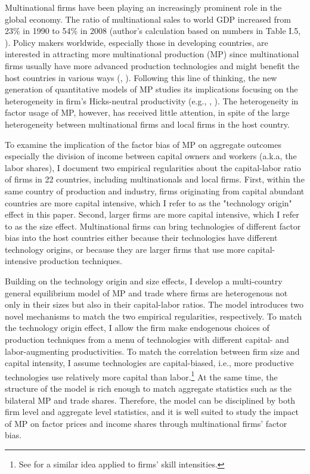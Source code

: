 \documentclass[notitlepage,11pt]{article}%
\begin{document}
Multinational firms have been playing an increasingly prominent role in the
global economy. The ratio of multinational sales to world GDP increased from
23\% in 1990 to 54\% in 2008 (author's calculation based on numbers in Table
I.5, \cite{unctad_world_2011}). Policy makers worldwide, especially those in
developing countries, are interested in attracting more multinational
production (MP) since multinational firms usually have more advanced
production technologies and might benefit the host countries in various ways
(\cite{javorcik_does_2004}, \cite{harrison_trade_2010}). Following this line
of thinking, the new generation of quantitative models of MP studies its
implications focusing on the heterogeneity in firm's Hicks-neutral
productivity (e.g., \cite{arkolakis_innovation_2013},
\cite{tintelnot_global_2014}). The heterogeneity in factor usage of MP,
however, has received little attention, in spite of the large heterogeneity
between multinational firms and local firms in the host country.

To examine the implication of the factor bias of MP on aggregate outcomes
especially the division of income between capital owners and workers (a.k.a,
the labor shares), I document two empirical regularities about the
capital-labor ratio of firms in 22 countries, including multinationals and
local firms. First, within the same country of production and industry, firms
originating from capital abundant countries are more capital intensive, which
I refer to as the "technology origin" effect in this paper. Second, larger
firms are more capital intensive, which I refer to as the size effect.
Multinational firms can bring technologies of different factor bias into the
host countries either because their technologies have different technology
origins, or because they are larger firms that use more capital-intensive
production techniques.

Building on the technology origin and size effects, I develop a multi-country
general equilibrium model of MP and trade where firms are heterogenous not
only in their sizes but also in their capital-labor ratios. The model
introduces two novel mechanisms to match the two empirical regularities,
respectively. To match the technology origin effect, I allow the firm make
endogenous choices of production techniques from a menu of technologies with
different capital- and labor-augmenting productivities. To match the
correlation between firm size and capital intensity, I assume technologies are
capital-biased, i.e., more productive technologies use relatively more capital
than labor.\footnote{See \cite{burstein_international_2015} for a similar idea
applied to firms' skill intensities.} At the same time, the structure of the
model is rich enough to match aggregate statistics such as the bilateral MP
and trade shares. Therefore, the model can be disciplined by both firm level
and aggregate level statistics, and it is well suited to study the impact of
MP on factor prices and income shares through multinational firms' factor bias.
\end{document}
